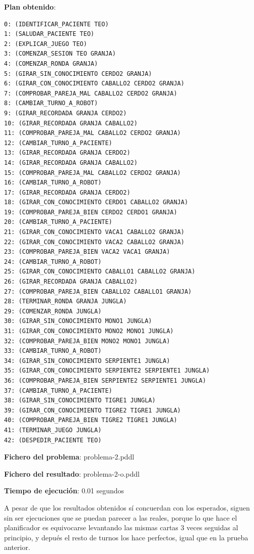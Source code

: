 \documentclass{uc3mpracticas}
\begin{document}
  \begin{multicols}{2}
    \textbf{Plan obtenido}:

    \begin{lstlisting}
0: (IDENTIFICAR_PACIENTE TEO)
1: (SALUDAR_PACIENTE TEO)
2: (EXPLICAR_JUEGO TEO)
3: (COMENZAR_SESION TEO GRANJA)
4: (COMENZAR_RONDA GRANJA)
5: (GIRAR_SIN_CONOCIMIENTO CERDO2 GRANJA)
6: (GIRAR_CON_CONOCIMIENTO CABALLO2 CERDO2 GRANJA)
7: (COMPROBAR_PAREJA_MAL CABALLO2 CERDO2 GRANJA)
8: (CAMBIAR_TURNO_A_ROBOT)
9: (GIRAR_RECORDADA GRANJA CERDO2)
10: (GIRAR_RECORDADA GRANJA CABALLO2)
11: (COMPROBAR_PAREJA_MAL CABALLO2 CERDO2 GRANJA)
12: (CAMBIAR_TURNO_A_PACIENTE)
13: (GIRAR_RECORDADA GRANJA CERDO2)
14: (GIRAR_RECORDADA GRANJA CABALLO2)
15: (COMPROBAR_PAREJA_MAL CABALLO2 CERDO2 GRANJA)
16: (CAMBIAR_TURNO_A_ROBOT)
17: (GIRAR_RECORDADA GRANJA CERDO2)
18: (GIRAR_CON_CONOCIMIENTO CERDO1 CABALLO2 GRANJA)
19: (COMPROBAR_PAREJA_BIEN CERDO2 CERDO1 GRANJA)
20: (CAMBIAR_TURNO_A_PACIENTE)
21: (GIRAR_CON_CONOCIMIENTO VACA1 CABALLO2 GRANJA)
22: (GIRAR_CON_CONOCIMIENTO VACA2 CABALLO2 GRANJA)
23: (COMPROBAR_PAREJA_BIEN VACA2 VACA1 GRANJA)
24: (CAMBIAR_TURNO_A_ROBOT)
25: (GIRAR_CON_CONOCIMIENTO CABALLO1 CABALLO2 GRANJA)
26: (GIRAR_RECORDADA GRANJA CABALLO2)
27: (COMPROBAR_PAREJA_BIEN CABALLO2 CABALLO1 GRANJA)
28: (TERMINAR_RONDA GRANJA JUNGLA)
29: (COMENZAR_RONDA JUNGLA)
30: (GIRAR_SIN_CONOCIMIENTO MONO1 JUNGLA)
31: (GIRAR_CON_CONOCIMIENTO MONO2 MONO1 JUNGLA)
32: (COMPROBAR_PAREJA_BIEN MONO2 MONO1 JUNGLA)
33: (CAMBIAR_TURNO_A_ROBOT)
34: (GIRAR_SIN_CONOCIMIENTO SERPIENTE1 JUNGLA)
35: (GIRAR_CON_CONOCIMIENTO SERPIENTE2 SERPIENTE1 JUNGLA)
36: (COMPROBAR_PAREJA_BIEN SERPIENTE2 SERPIENTE1 JUNGLA)
37: (CAMBIAR_TURNO_A_PACIENTE)
38: (GIRAR_SIN_CONOCIMIENTO TIGRE1 JUNGLA)
39: (GIRAR_CON_CONOCIMIENTO TIGRE2 TIGRE1 JUNGLA)
40: (COMPROBAR_PAREJA_BIEN TIGRE2 TIGRE1 JUNGLA)
41: (TERMINAR_JUEGO JUNGLA)
42: (DESPEDIR_PACIENTE TEO)
    \end{lstlisting}

    \columnbreak

    \textbf{Fichero del problema}: problema-2.pddl

    \textbf{Fichero del resultado}: problema-2-o.pddl

    \textbf{Tiempo de ejecución}: 0.01 segundos
  \end{multicols}

  A pesar de que los resultados obtenidos sí concuerdan con los esperados, siguen sin ser ejecuciones que se puedan parecer a las reales, porque lo que hace el planificador es equivocarse levantando las mismas cartas 3 veces seguidas al principio, y depués el resto de turnos los hace perfectos, igual que en la prueba anterior.
\end{document}
